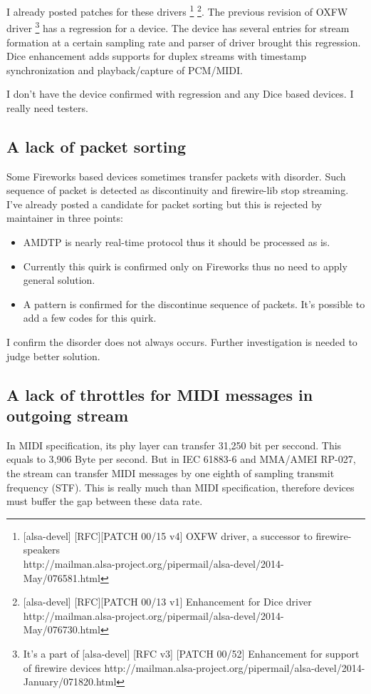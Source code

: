 \documentclass[onecolumn]{article}
\begin{document}
I already posted patches for these drivers \footnote{[alsa-devel] [RFC][PATCH 00/15 v4] OXFW driver, a successor to firewire-speakers \\ http://mailman.alsa-project.org/pipermail/alsa-devel/2014-May/076581.html} \footnote{[alsa-devel] [RFC][PATCH 00/13 v1] Enhancement for Dice driver \\ http://mailman.alsa-project.org/pipermail/alsa-devel/2014-May/076730.html}. The previous revision of OXFW driver \footnote{It's a part of [alsa-devel] [RFC v3] [PATCH 00/52] Enhancement for support of firewire devices http://mailman.alsa-project.org/pipermail/alsa-devel/2014-January/071820.html} has a regression for a device. The device has several entries for stream formation at a certain sampling rate and parser of driver brought this regression. Dice enhancement adds supports for duplex streams with timestamp synchronization and playback/capture of PCM/MIDI.

I don't have the device confirmed with regression and any Dice based devices. I really need testers.

\subsection{A lack of packet sorting}
Some Fireworks based devices sometimes transfer packets with disorder. Such sequence of packet is detected as discontinuity and firewire-lib stop streaming. I've already posted a candidate for packet sorting but this is rejected by maintainer in three points:
\begin{itemize}
\item AMDTP is nearly real-time protocol thus it should be processed as is.
\item Currently this quirk is confirmed only on Fireworks thus no need to apply general solution.
\item A pattern is confirmed for the discontinue sequence of packets. It's possible to add a few codes for this quirk.
\end{itemize}

I confirm the disorder does not always occurs. Further investigation is needed to judge better solution.

\subsection{A lack of throttles for MIDI messages in outgoing stream}
In MIDI specification, its phy layer can transfer 31,250 bit per seccond. This equals to 3,906 Byte per second. But in IEC 61883-6\cite{iec61883-6-1, iec61883-6-2} and MMA/AMEI RP-027\cite{amei-rp27}, the stream can transfer MIDI messages by one eighth of sampling transmit frequency (STF). This is really much than MIDI specification, therefore devices must buffer the gap between these data rate.
\end{document}
